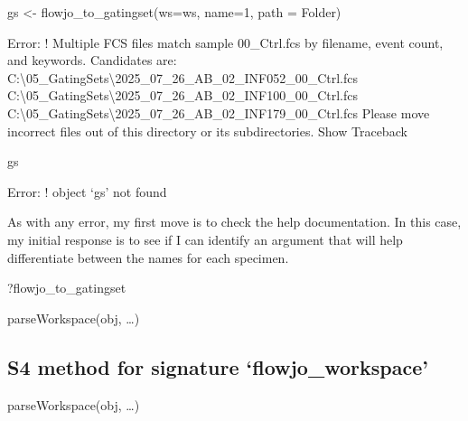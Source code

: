 \documentclass[
  letterpaper,
  DIV=11,
  numbers=noendperiod]{scrartcl}
\newenvironment{Shaded}{\begin{snugshade}}{\end{snugshade}}
\newcommand{\AttributeTok}[1]{\textcolor[rgb]{0.40,0.45,0.13}{#1}}
\newcommand{\DecValTok}[1]{\textcolor[rgb]{0.68,0.00,0.00}{#1}}
\newcommand{\FunctionTok}[1]{\textcolor[rgb]{0.28,0.35,0.67}{#1}}
\newcommand{\NormalTok}[1]{\textcolor[rgb]{0.00,0.23,0.31}{#1}}
\newcommand{\OtherTok}[1]{\textcolor[rgb]{0.00,0.23,0.31}{#1}}
\begin{document}
\begin{Shaded}
\begin{Highlighting}[]
\NormalTok{gs }\OtherTok{\textless{}{-}} \FunctionTok{flowjo\_to\_gatingset}\NormalTok{(}\AttributeTok{ws=}\NormalTok{ws, }\AttributeTok{name=}\DecValTok{1}\NormalTok{, }\AttributeTok{path =}\NormalTok{ Folder)}
\end{Highlighting}
\end{Shaded}

Error: ! Multiple FCS files match sample 00\_Ctrl.fcs by filename, event
count, and keywords. Candidates are:
C:\Users\Macarena\CytometryInR\course\textbackslash05\_GatingSets\data\textbackslash2025\_07\_26\_AB\_02\_INF052\_00\_Ctrl.fcs
C:\Users\Macarena\CytometryInR\course\textbackslash05\_GatingSets\data\textbackslash2025\_07\_26\_AB\_02\_INF100\_00\_Ctrl.fcs
C:\Users\Macarena\CytometryInR\course\textbackslash05\_GatingSets\data\textbackslash2025\_07\_26\_AB\_02\_INF179\_00\_Ctrl.fcs
Please move incorrect files out of this directory or its subdirectories.
Show Traceback

\begin{Shaded}
\begin{Highlighting}[]
\NormalTok{gs}
\end{Highlighting}
\end{Shaded}

Error: ! object `gs' not found

As with any error, my first move is to check the help documentation. In
this case, my initial response is to see if I can identify an argument
that will help differentiate between the names for each specimen.

\begin{Shaded}
\begin{Highlighting}[]
\NormalTok{?flowjo\_to\_gatingset}
\end{Highlighting}
\end{Shaded}

parseWorkspace(obj, \ldots)

\subsection{S4 method for signature
`flowjo\_workspace'}\label{s4-method-for-signature-flowjo_workspace}

parseWorkspace(obj, \ldots)
\end{document}
